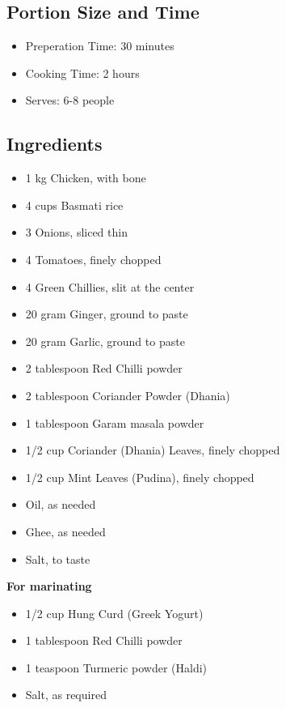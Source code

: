 \documentclass{article}
\begin{document}
        \subsection{Portion Size and Time}
            \begin{itemize}
                \item Preperation Time: 30 minutes
                \item Cooking Time: 2 hours
                \item Serves:   6-8 people
            \end{itemize}
        \subsection{Ingredients}
            \begin{itemize}
                \item 1 kg Chicken, with bone 
                \item 4 cups Basmati rice
                \item 3 Onions, sliced thin 
                \item 4 Tomatoes, finely chopped
                \item 4 Green Chillies, slit at the center
                \item 20 gram Ginger, ground to paste
                \item 20 gram Garlic, ground to paste
                \item 2 tablespoon Red Chilli powder	
                \item 2 tablespoon Coriander Powder (Dhania)	
                \item 1 tablespoon Garam masala powder	
                \item 1/2 cup Coriander (Dhania) Leaves, finely chopped
                \item 1/2 cup Mint Leaves (Pudina), finely chopped
                \item Oil, as needed
                \item Ghee, as needed
                \item Salt, to taste 
            \end{itemize}
            \textbf{For marinating} 
            \begin{itemize}
                \item 1/2 cup Hung Curd (Greek Yogurt)	
                \item 1 tablespoon Red Chilli powder	
                \item 1 teaspoon Turmeric powder (Haldi)	
                \item Salt, as required 
            \end{itemize}   
\end{document}
